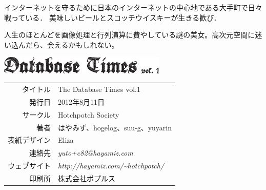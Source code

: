 \documentclass[b5paper,papersize,tombow,11pt]{jsbook}
\begin{document}
 \quad
インターネットを守るために日本のインターネットの中心地である大手町で日々戦っている．
美味しいビールとスコッチウイスキーが生きる歓び．

 \quad
人生のほとんどを画像処理と行列演算に費やしている謎の美女。高次元空間に迷い込んだら、会えるかもしれない。

\vspace*{60mm}

\begin{center}
 \includegraphics[width=8cm]{hayamiz/images/colophon.eps}
 \par\vspace*{1mm}
 \begin{tabular}{rl}
  \hline
  タイトル & The Database Times vol.1 \\
  発行日 & 2012年8月11日 \\
  サークル & Hotchpotch Society \\
  著者 & はやみず、hogelog、suu-g、yuyarin \\
  表紙デザイン & Eliza \\
  連絡先 & {\it yuto+c82@hayamiz.com} \\
  ウェブサイト & {\it http://hayamiz.com/\~{}hotchpotch/} \\
  印刷所 & 株式会社ポプルス \\
  \hline
 \end{tabular}
\end{center}
\end{document}

